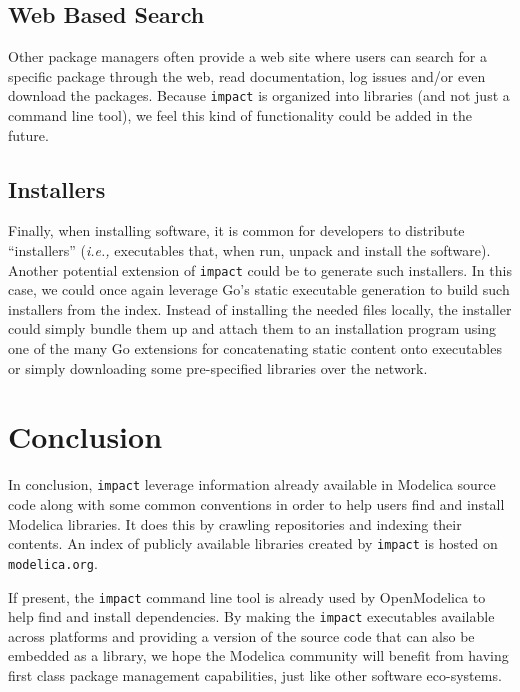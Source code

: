 \documentclass[11pt,a4paper,twocolumn]{article}
\newcommand{\code}[1]{\texttt{#1}} %
\begin{document}
\subsection{Web Based Search}

Other package managers often provide a web site where users can search
for a specific package through the web, read documentation, log issues
and/or even download the packages.  Because \code{impact} is organized
into libraries (and not just a command line tool), we feel this kind
of functionality could be added in the future.

\subsection{Installers}


Finally, when installing software, it is common for developers to
distribute ``installers'' ({\it i.e.,} executables that, when run,
unpack and install the software).  Another potential extension of
\code{impact} could be to generate such installers.  In this case, we
could once again leverage Go's static executable generation to build
such installers from the index.  Instead of installing the needed
files locally, the installer could simply bundle them up and attach
them to an installation program using one of the many Go
extensions\cite{go.rice}\cite{https://bitbucket.org/tebeka/nrsc/} for
concatenating static content onto executables or simply downloading
some pre-specified libraries over the network.

\section{Conclusion}

In conclusion, \code{impact} leverage information already available in
Modelica source code along with some common conventions in order to
help users find and install Modelica libraries.  It does this by
crawling repositories and indexing their contents.  An index of
publicly available libraries created by \code{impact} is hosted on
\code{modelica.org}.

If present, the \code{impact} command line tool is already used by
OpenModelica to help find and install dependencies.  By making the
\code{impact} executables available across platforms and providing a
version of the source code that can also be embedded as a library, we
hope the Modelica community will benefit from having first class
package management capabilities, just like other software eco-systems.
\end{document}

